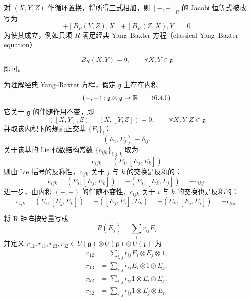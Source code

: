 对 $(X,Y,Z)$ 作循环置换，将所得三式相加，则 $[-,-]_R$ 的 Jacobi 恒等式被改写为
\begin{equation}
  [B_R(X,Y),Z] + [B_R(Y,Z),X] + [B_R(Z,X),Y] = 0
  \tag{6.4.3}
\end{equation}
为使其成立，例如只须 $R$ 满足经典 Yang--Baxter 方程（classical Yang--Baxter equation）

\begin{equation}
  B_R(X,Y) = 0,\qquad \forall X,Y\in\mathfrak{g}
  \tag{6.4.4}
\end{equation}
即可。


为理解经典 Yang--Baxter 方程，假定 $\mathfrak{g}$ 上存在内积
\begin{equation}
  (-,-):\mathfrak{g}\otimes\mathfrak{g}\to\mathbb{R}
  \tag{6.4.5}
\end{equation}
它关于 $\mathfrak{g}$ 的伴随作用不变，即
\begin{equation}
  ([X,Y],Z) + (X,[Y,Z]) = 0,\qquad \forall X,Y,Z\in\mathfrak{g}
  \tag{6.4.6}
\end{equation}
并取该内积下的规范正交基 $\{E_i\}_i$：
\begin{equation}
  (E_i,E_j) = \delta_{ij}.
  \tag{6.4.7}
\end{equation}
关于该基的 Lie 代数结构常数 $\{c_{ijk}\}_{i,j,k}$ 取为
\begin{equation}
  c_{ijk} := (E_i,[E_j,E_k])
  \tag{6.4.8}
\end{equation}
则由 Lie 括号的反称性，$c_{ijk}$ 关于 $j$ 与 $k$ 的交换是反称的：
\begin{equation}
  c_{ijk} = (E_i,[E_j,E_k]) = -(E_i,[E_k,E_j]) = -c_{ikj}.
  \tag{6.4.9}
\end{equation}
进一步，由内积 $(-,-)$ 的伴随不变性，$c_{ijk}$ 关于 $i$ 与 $k$ 的交换也是反称的：
\begin{equation}
  c_{ijk} = (E_i,[E_j,E_k]) = -([E_j,E_i],E_k) = -(E_k,[E_j,E_i]) = -c_{kji}.
  \tag{6.4.10}
\end{equation}

将 R 矩阵按分量写成
\begin{equation}
  R(E_j) = \sum_i r_{ij}E_i
  \tag{6.4.11}
\end{equation}
并定义 $r_{12},r_{13},r_{23},r_{32}\in U(\mathfrak{g})\otimes U(\mathfrak{g})\otimes U(\mathfrak{g})$ 为
\begin{align}
  r_{12} &= \sum_{i,j} r_{ij}E_i\otimes E_j\otimes 1, \tag{6.4.12}\\
  r_{13} &= \sum_{i,j} r_{ij}E_i\otimes 1\otimes E_j, \tag{6.4.13}\\
  r_{23} &= \sum_{i,j} r_{ij}1\otimes E_i\otimes E_j, \tag{6.4.14}\\
  r_{32} &= \sum_{i,j} r_{ij}1\otimes E_j\otimes E_i \tag{6.4.15}
\end{align}

